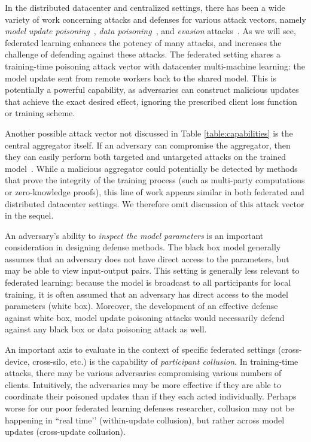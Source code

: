 \documentclass[11pt]{article}
\begin{document}
In the distributed datacenter and centralized settings, there has been a wide variety of work concerning attacks and defenses for various attack vectors, namely \emph{model update poisoning}~\citep{blanchard2017machine, Chen2017DistributedSM, chen18draco, mhamdi2018hidden, alistarh2018byzantine}, \emph{data poisoning}~\citep{Biggio:2012:PAA:3042573.3042761, cretu2008casting, steinhardt2017certified, pmlr-v97-diakonikolas19a}, and \emph{evasion} attacks~\citep{biggio2013evasion, szegedy2013intriguing, goodfellow2014explaining, carlini2017towards, madry2017towards}. As we will see, federated learning enhances the potency of many attacks, and increases the challenge of defending against these attacks. The federated setting shares a training-time poisoning attack vector with datacenter multi-machine learning: the model update sent from remote workers back to the shared model. This is potentially a powerful capability, as adversaries can construct malicious updates that achieve the exact desired effect, ignoring the prescribed client loss function or training scheme.

Another possible attack vector not discussed in Table \ref{table:capabilities} is the central aggregator itself. If an adversary can compromise the aggregator, then they can easily perform both targeted and untargeted attacks on the trained model~\citep{DBLP:conf/ndss/LiuMALZW018}. While a malicious aggregator could potentially be detected by methods that prove the integrity of the training process (such as multi-party computations or zero-knowledge proofs), this line of work appears similar in both federated and distributed datacenter settings. We therefore omit discussion of this attack vector in the sequel.

An adversary's ability to \emph{inspect the model parameters} is an important consideration in designing defense methods. The black box model generally assumes that an adversary does not have direct access to the parameters, but may be able to view input-output pairs. This setting is generally less relevant to federated learning: because the model is broadcast to all participants for local training, it is often assumed that an adversary has direct access to the model parameters (white box). Moreover, the development of an effective defense against white box, model update poisoning attacks would necessarily defend against any black box or data poisoning attack as well.

An important axis to evaluate in the context of specific federated settings (cross-device, cross-silo, etc.) is the capability of \emph{participant collusion}. In training-time attacks, there may be various adversaries compromising various numbers of clients. Intuitively, the adversaries may be more effective if they are able to coordinate their poisoned updates than if they each acted individually. Perhaps worse for our poor federated learning defenses researcher, collusion may not be happening in ``real time’’ (within-update collusion), but rather across model updates (cross-update collusion). 
\end{document}
